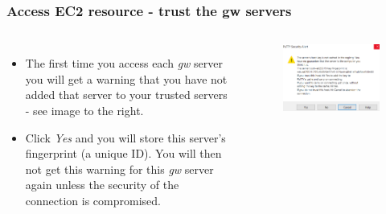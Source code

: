 \documentclass[aspectratio=169]{beamer} %
\begin{document}
\begin{frame}
	\frametitle{Access EC2 resource - trust the gw servers}
	\begin{columns}[c]
		\begin{itemize}
			\setlength\itemsep{1em}
			\item The first time you access each \textit{gw} server 
			you will get a warning that you have not 
			added that server to your trusted servers -
			see image to the right.
			\item Click \textit{Yes} and you will store this server's fingerprint (a unique ID).
			You will then not get this warning for this \textit{gw} server again
			unless the security of the connection is compromised.
		\end{itemize}
		
		\begin{figure}
			\centering
			\includegraphics[width=\textwidth]{./img/access-1a.png}
		\end{figure}
		
	\end{columns}
\end{frame}
\end{document}
